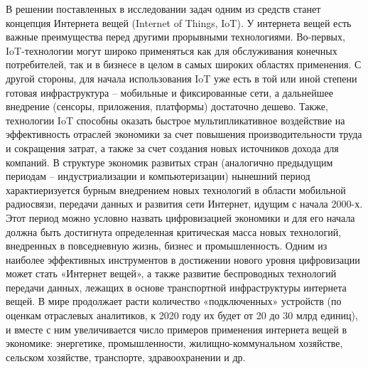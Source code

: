 В решении поставленных в исследовании задач одним из средств станет концепция Интернета вещей (Internet of Things, IoT).
У интернета вещей есть важные преимущества перед другими прорывными технологиями. Во-первых, IoT-технологии могут широко применяться как для обслуживания конечных потребителей, так и в бизнесе в целом в самых широких областях применения. С другой стороны, для начала использования IoT уже есть в той или иной степени готовая инфраструктура – мобильные и фиксированные сети, а дальнейшее внедрение (сенсоры, приложения, платформы) достаточно дешево. Также, технологии IoT способны оказать быстрое мультипликативное воздействие на эффективность отраслей экономики за счет повышения производительности труда и сокращения затрат, а также за счет создания новых источников дохода для компаний.
В структуре экономик развитых стран (аналогично предыдущим периодам – индустриализации и компьютеризации) нынешний период характиеризуется бурным внедрением новых технологий в области мобильной радиосвязи, передачи данных и развития сети Интернет, идущим с начала 2000-х. Этот период можно условно назвать цифровизацией экономики и для его начала должна быть достигнута определенная критическая масса новых технологий, внедренных в повседневную жизнь, бизнес и промышленность.
Одним из наиболее эффективных инструментов в достижении нового уровня цифровизации может стать «Интернет вещей», а также развитие беспроводных технологий передачи данных, лежащих в основе транспортной инфраструктуры интернета вещей. В мире продолжает расти количество «подключенных» устройств (по оценкам отраслевых аналитиков, к 2020 году их будет от 20 до 30 млрд единиц), и вместе с ним увеличивается число примеров применения интернета вещей в экономике: энергетике, промышленности, жилищно-коммунальном хозяйстве, сельском хозяйстве, транспорте, здравоохранении и др.





